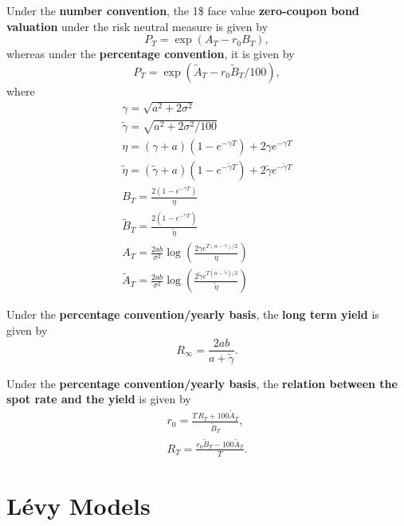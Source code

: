 \begin{outline}
  \1 Under the \textbf{number convention}, the 1\$ face value \textbf{zero-coupon bond
    valuation} under the risk neutral measure is given by
  \begin{equation*}
    P_T = \exp(A_T - r_0B_T),
  \end{equation*}
  whereas under the \textbf{percentage convention}, it is given by
  \begin{equation*}
    P_T = \exp(\tilde A_T - r_0\tilde B_T/100),
  \end{equation*}
  where
  \begin{gather*}
    \gamma = \sqrt{a^2 + 2\sigma^2}\\
    \tilde\gamma = \sqrt{a^2 + 2\sigma^2/100}\\
    \eta = (\gamma+a)(1-e^{-\gamma T})+2\gamma e^{-\gamma T}\\
    \tilde \eta  = (\tilde\gamma + a)(1-e^{-\tilde\gamma T})+2\tilde\gamma e^{-\tilde\gamma T}\\
    B_T = \frac{2(1-e^{-\gamma T})}{\eta}\\
    \tilde B_T = \frac{2(1-e^{-\tilde\gamma T})}{\tilde\eta}\\
    A_T = \frac{2ab}{\sigma^2}\log\left(\frac{2\gamma
        e^{T(a-\gamma)/2}}{\eta}\right)\\
    \tilde A_T = \frac{2ab}{\sigma^2}\log\left(\frac{2\tilde\gamma
        e^{T(a-\tilde\gamma)/2}}{\tilde\eta}\right)
  \end{gather*}

  \1 Under the \textbf{percentage convention/yearly basis}, the \textbf{long term yield}
  is given by
  \begin{equation*}
    R_\infty = \frac{2ab}{a+\tilde\gamma}.
  \end{equation*}

  \1 Under the \textbf{percentage convention/yearly basis}, the \textbf{relation between
    the spot rate and the yield} is given by
  \begin{gather*}
    r_0 = \frac{T\,R_T + 100\tilde A_T}{\tilde B_T},\\
    R_T = \frac{r_0\tilde B_T - 100\tilde A_T}{T}.
  \end{gather*}
\end{outline}


\section{Lévy Models}


